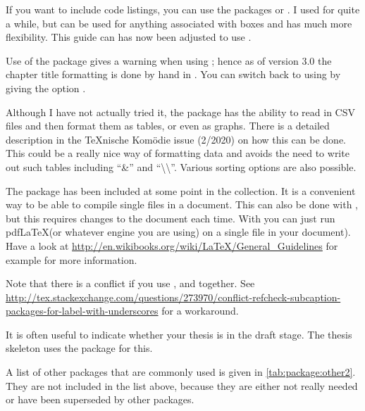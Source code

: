 If you want to include code listings,
you can use the packages  or .
I used  for quite a while,
but  can be used for anything associated with boxes and
has much more flexibility.
This guide can has now been adjusted to use .

Use of the  package gives a warning when using \KOMAScript{}; hence
as of version 3.0 the chapter title formatting is done by hand in .
You can switch back to using  by giving the option .

Although I have not actually tried it,
the  package has the ability to read in CSV files and
then format them as tables, or even as graphs.
There is a detailed description in the \TeX nische Komödie issue (2/2020)
on how this can be done.
This could be a really nice way of formatting data
and avoids the need to write out such tables including \enquote{\&} and \enquote{\textbackslash\textbackslash}.
Various sorting options are also possible.

The  package has been included at some point
in the  collection.
It is a convenient way to be able to compile single files in a document.
This can also be done with , but this requires changes to the document each time.
With  you can just run pdf\LaTeX (or whatever engine you are using)
on a single file in your document).
Have a look at \url{http://en.wikibooks.org/wiki/LaTeX/General_Guidelines} for
example for more information.

\begin{sloppypar}
Note that there is a conflict if you use ,  and  together.
See \url{http://tex.stackexchange.com/questions/273970/conflict-refcheck-subcaption-packages-for-label-with-underscores} for a workaround.
\end{sloppypar}

It is often useful to indicate whether your thesis is in the draft stage.
The thesis skeleton uses the package  for this.

A list of other packages that are commonly used is given in
\cref{tab:package:other2}. They are not
included in the list above, because they are either not really needed
or have been superseded by other packages.


